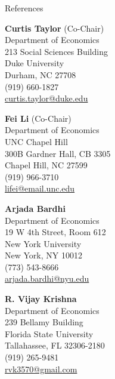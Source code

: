 \begin{rSection}{References}
	
	\medskip 
	\begin{center}
		\begin{minipage}{.31\linewidth}
			{\large \textbf{Curtis Taylor} (Co-Chair)}	\\[3pt]
			Department of Economics	\\		
			213 Social Sciences Building\\		
			Duke University\\		
			Durham, NC 27708\\[3pt]
						(919) 660-1827\\[3pt]
			\href{mailto:curtis.taylor@duke.edu}{curtis.taylor@duke.edu}
		\end{minipage}
		\hspace*{80pt}
		\begin{minipage}{.31\linewidth}
			{\large \textbf{Fei Li} (Co-Chair) }	\\[3pt]
			Department of Economics\\
			UNC Chapel Hill\\
			300B Gardner Hall, CB 3305\\
			Chapel Hill, NC 27599\\[3pt]
						(919) 966-3710\\[3pt]
			\href{mailto:lifei@email.unc.edu}{lifei@email.unc.edu}
		\end{minipage}
		
		\vspace*{20pt}
		
		\begin{minipage}{.31\linewidth}
			{\large \textbf{Arjada Bardhi}}	\\[3pt]
			Department of Economics	\\		
			19 W 4th Street, Room 612\\		
			New York University\\		
			New York, NY 10012\\[3pt]
						(773) 543-8666\\[3pt]
			\href{mailto:arjada.bardhi@nyu.edu}{arjada.bardhi@nyu.edu}
		\end{minipage}
		\hspace*{80pt}
		\begin{minipage}{.31\linewidth}
			{\large \textbf{R. Vijay Krishna}}	\\[3pt]
			Department of Economics	\\		
			239 Bellamy Building\\		
			Florida State University\\		
			Tallahassee, FL 32306-2180\\[3pt]
						(919) 265-9481 \\[3pt]
			\href{mailto:rvk3570@gmail.com}{rvk3570@gmail.com}
		\end{minipage}
	\end{center}
	
	
	
	
\end{rSection}
	
